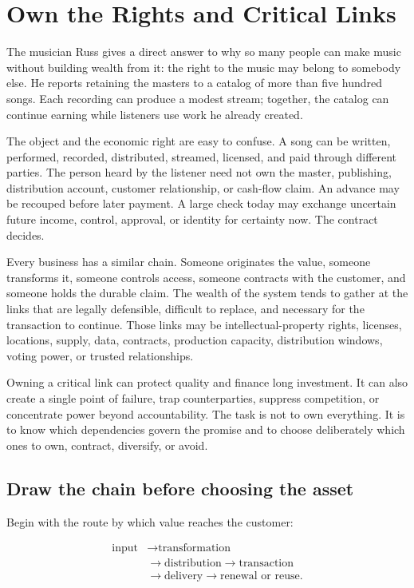 \chapter{Own the Rights and Critical Links}

The musician Russ gives a direct answer to why so many people can make music
without building wealth from it: the right to the music may belong to somebody
else. He reports retaining the masters to a catalog of more than five hundred
songs. Each recording can produce a modest stream; together, the catalog can
continue earning while listeners use work he already created.

The object and the economic right are easy to confuse. A song can be written,
performed, recorded, distributed, streamed, licensed, and paid through
different parties. The person heard by the listener need not own the master,
publishing, distribution account, customer relationship, or cash-flow claim.
An advance may be recouped before later payment. A large check today may
exchange uncertain future income, control, approval, or identity for certainty
now. The contract decides.

Every business has a similar chain. Someone originates the value, someone
transforms it, someone controls access, someone contracts with the customer,
and someone holds the durable claim. The wealth of the system tends to gather
at the links that are legally defensible, difficult to replace, and necessary
for the transaction to continue. Those links may be intellectual-property
rights, licenses, locations, supply, data, contracts, production capacity,
distribution windows, voting power, or trusted relationships.

Owning a critical link can protect quality and finance long investment. It can
also create a single point of failure, trap counterparties, suppress
competition, or concentrate power beyond accountability. The task is not to
own everything. It is to know which dependencies govern the promise and to
choose deliberately which ones to own, contract, diversify, or avoid.

\section{Draw the chain before choosing the asset}

Begin with the route by which value reaches the customer:

\begin{equation}
\begin{aligned}
\text{input}&\longrightarrow\text{transformation}\\
&\longrightarrow\text{distribution}\longrightarrow\text{transaction}\\
&\longrightarrow\text{delivery}\longrightarrow\text{renewal or reuse}.
\end{aligned}
\end{equation}

